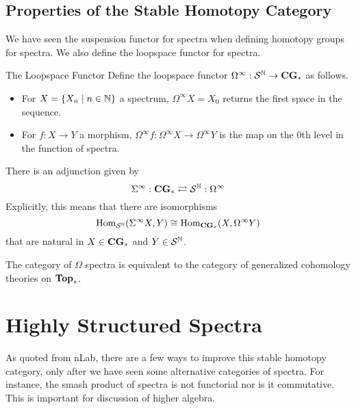\documentclass[a4paper]{article}
\begin{document}
\subsection{Properties of the Stable Homotopy Category}
We have seen the suspension functor for spectra when defining homotopy groups for spectra. We also define the loopspace functor for spectra. 

\begin{defn}{The Loopspace Functor}{} Define the loopspace functor $\Omega^\infty:\mathcal{S}^{\mathbb{N}}\to\bold{CG}_\ast$ as follows. 
\begin{itemize}
\item For $X=\{X_n\;|\;n\in\mathbb{N}\}$ a spectrum, $\Omega^\infty X=X_0$ returns the first space in the sequence. 
\item For $f:X\to Y$ a morphism, $\Omega^\infty f:\Omega^\infty X\to\Omega^\infty Y$ is the map on the $0$th level in the function of spectra. 
\end{itemize}
\end{defn}

\begin{thm}{}{} There is an adjunction given by $$\Sigma^\infty:\bold{CG}_\ast\rightleftarrows\mathcal{S}^{\mathbb{N}} :\Omega^\infty$$ Explicitly, this means that there are isomorphisms $$\operatorname{Hom}_{\mathcal{S}^{\mathbb{N}} }(\Sigma^\infty X,Y)\cong\operatorname{Hom}_{\bold{CG}_\ast}(X,\Omega^\infty Y)$$ that are natural in $X\in\bold{CG}_\ast$ and $Y\in\mathcal{S}^{\mathbb{N}} $. 
\end{thm}

\begin{thm}{}{} The category of $\Omega$ spectra is equivalent to the category of generalized cohomology theories on $\bold{Top}_\ast$. 
\end{thm}

\pagebreak
\section{Highly Structured Spectra}
As quoted from nLab, there are a few ways to improve this stable homotopy category, only after we have seen some alternative categories of spectra. For instance, the smash product of spectra is not functorial nor is it commutative. This is important for discussion of higher algebra. 
\end{document}
